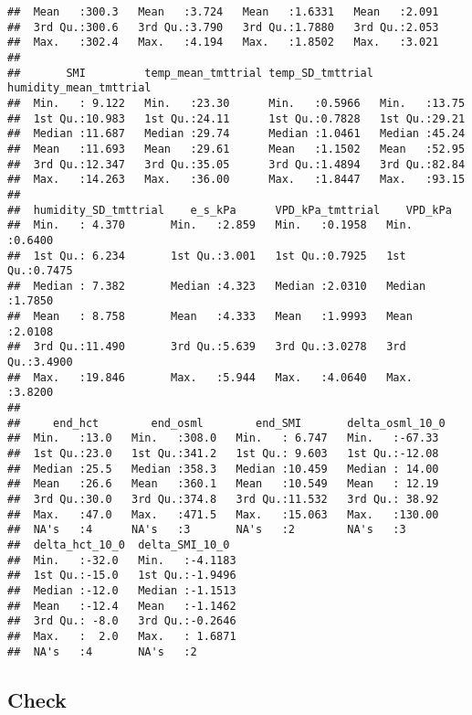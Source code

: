 \documentclass[
]{article}
\begin{document}
\begin{verbatim}
##  Mean   :300.3   Mean   :3.724   Mean   :1.6331   Mean   :2.091  
##  3rd Qu.:300.6   3rd Qu.:3.790   3rd Qu.:1.7880   3rd Qu.:2.053  
##  Max.   :302.4   Max.   :4.194   Max.   :1.8502   Max.   :3.021  
##                                                                  
##       SMI         temp_mean_tmttrial temp_SD_tmttrial humidity_mean_tmttrial
##  Min.   : 9.122   Min.   :23.30      Min.   :0.5966   Min.   :13.75         
##  1st Qu.:10.983   1st Qu.:24.11      1st Qu.:0.7828   1st Qu.:29.21         
##  Median :11.687   Median :29.74      Median :1.0461   Median :45.24         
##  Mean   :11.693   Mean   :29.61      Mean   :1.1502   Mean   :52.95         
##  3rd Qu.:12.347   3rd Qu.:35.05      3rd Qu.:1.4894   3rd Qu.:82.84         
##  Max.   :14.263   Max.   :36.00      Max.   :1.8447   Max.   :93.15         
##                                                                             
##  humidity_SD_tmttrial    e_s_kPa      VPD_kPa_tmttrial    VPD_kPa      
##  Min.   : 4.370       Min.   :2.859   Min.   :0.1958   Min.   :0.6400  
##  1st Qu.: 6.234       1st Qu.:3.001   1st Qu.:0.7925   1st Qu.:0.7475  
##  Median : 7.382       Median :4.323   Median :2.0310   Median :1.7850  
##  Mean   : 8.758       Mean   :4.333   Mean   :1.9993   Mean   :2.0108  
##  3rd Qu.:11.490       3rd Qu.:5.639   3rd Qu.:3.0278   3rd Qu.:3.4900  
##  Max.   :19.846       Max.   :5.944   Max.   :4.0640   Max.   :3.8200  
##                                                                        
##     end_hct        end_osml        end_SMI       delta_osml_10_0 
##  Min.   :13.0   Min.   :308.0   Min.   : 6.747   Min.   :-67.33  
##  1st Qu.:23.0   1st Qu.:341.2   1st Qu.: 9.603   1st Qu.:-12.08  
##  Median :25.5   Median :358.3   Median :10.459   Median : 14.00  
##  Mean   :26.6   Mean   :360.1   Mean   :10.549   Mean   : 12.19  
##  3rd Qu.:30.0   3rd Qu.:374.8   3rd Qu.:11.532   3rd Qu.: 38.92  
##  Max.   :47.0   Max.   :471.5   Max.   :15.063   Max.   :130.00  
##  NA's   :4      NA's   :3       NA's   :2        NA's   :3       
##  delta_hct_10_0  delta_SMI_10_0   
##  Min.   :-32.0   Min.   :-4.1183  
##  1st Qu.:-15.0   1st Qu.:-1.9496  
##  Median :-12.0   Median :-1.1513  
##  Mean   :-12.4   Mean   :-1.1462  
##  3rd Qu.: -8.0   3rd Qu.:-0.2646  
##  Max.   :  2.0   Max.   : 1.6871  
##  NA's   :4       NA's   :2
\end{verbatim}

\hypertarget{check}{%
\subsection{Check}\label{check}}
\end{document}
